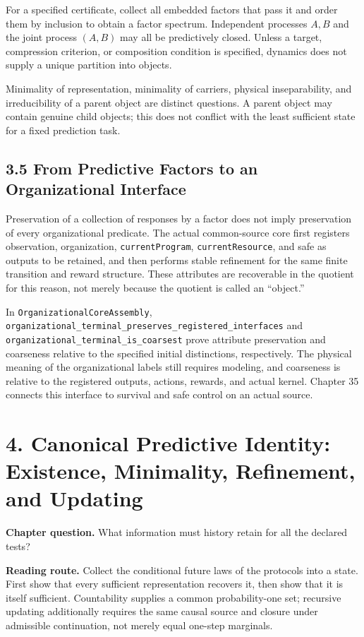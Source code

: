 \documentclass[
  english,
  11pt,
  oneside]{book}
\begin{document}
For a specified certificate, collect all embedded factors that pass it and order them by inclusion to obtain a factor spectrum. Independent processes \(A,B\) and the joint process \((A,B)\) may all be predictively closed. Unless a target, compression criterion, or composition condition is specified, dynamics does not supply a unique partition into objects.

Minimality of representation, minimality of carriers, physical inseparability, and irreducibility of a parent object are distinct questions. A parent object may contain genuine child objects; this does not conflict with the least sufficient state for a fixed prediction task.

\section{3.5 From Predictive Factors to an Organizational Interface}\label{from-predictive-factors-to-an-organizational-interface}

Preservation of a collection of responses by a factor does not imply preservation of every organizational predicate. The actual common-source core first registers observation, organization, \nolinkurl{currentProgram}, \nolinkurl{currentResource}, and safe as outputs to be retained, and then performs stable refinement for the same finite transition and reward structure. These attributes are recoverable in the quotient for this reason, not merely because the quotient is called an ``object.''

In \nolinkurl{OrganizationalCoreAssembly}, \nolinkurl{organizational_terminal_preserves_registered_interfaces} and \nolinkurl{organizational_terminal_is_coarsest} prove attribute preservation and coarseness relative to the specified initial distinctions, respectively. The physical meaning of the organizational labels still requires modeling, and coarseness is relative to the registered outputs, actions, rewards, and actual kernel. Chapter 35 connects this interface to survival and safe control on an actual source.

\chapter{4. Canonical Predictive Identity: Existence, Minimality, Refinement, and Updating}\label{ch-4}

\textbf{Chapter question.} What information must history retain for all the declared tests?

\textbf{Reading route.} Collect the conditional future laws of the protocols into a state. First show that every sufficient representation recovers it, then show that it is itself sufficient. Countability supplies a common probability-one set; recursive updating additionally requires the same causal source and closure under admissible continuation, not merely equal one-step marginals.
\end{document}
